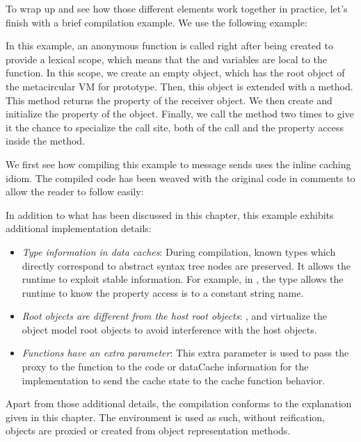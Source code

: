 To wrap up and see how those different elements work together in practice,
let's finish with a brief compilation example. We use the following example:


In this example, an anonymous function is called right after being created to
provide a lexical scope, which means that the  and  variables are
local to the function. In this scope, we create an  empty object, which
has the root object of the metacircular VM for prototype. Then, this object is
extended with a  method. This method returns the  property of
the receiver object. We then create and initialize the  property of the
 object. Finally, we call the  method two times to give it the
chance to specialize the call site, both of the  call and the 
property access inside the  method.

We first see how compiling this example to message sends uses the inline
caching idiom. The compiled code has been weaved with the original code in
comments to allow the reader to follow easily:


\newpage

In addition to what has been discussed in this chapter, this example exhibits
additional implementation details:
\begin{itemize}
    \item \textit{Type information in data caches}: During compilation, known
    types which directly correspond to abstract syntax tree nodes are preserved.
    It allows the runtime to exploit stable information. For example, in
    , the  type allows the runtime to know the
    property access is to a constant string name.    
    \item \textit{Root objects are different from the host root objects}:
    ,  and  virtualize the
    object model root objects to avoid interference with the host objects.
    \item \textit{Functions have an extra  parameter}: This extra
    parameter is used to pass the proxy to the function to the code or
    dataCache information for the implementation to send the cache state to the
    cache function behavior.
\end{itemize}

Apart from those additional details, the compilation conforms to the
explanation given in this chapter. The environment is used as such, without
reification, objects are proxied or created from object representation methods.

